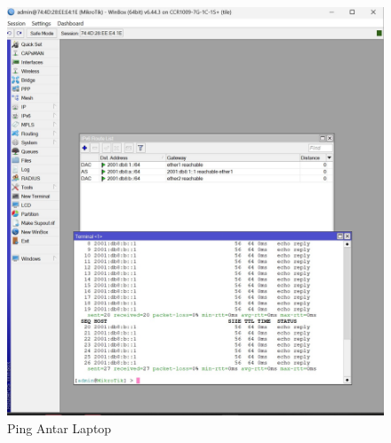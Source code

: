 \begin{enumerate}
    \begin{figure}[H]
        \centering
        \includegraphics[width=0.5\linewidth]{P2/img/1 (13).jpg}
        \caption{Ping Antar Laptop}
        \label{fig:gambar8}
    \end{figure}
\end{enumerate}

